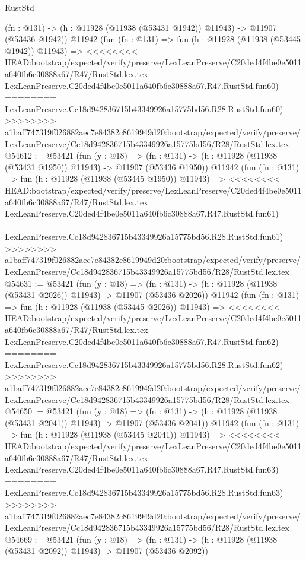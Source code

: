 \begin{lexlean}{RustStd}
\begin{coremodule}
{\begin{coremodule}
{{{{{{{{{{{{{{{{{{{{{{{{{{{{{{{{{{{{{{{{{{{{{{{{{{{{{{{{{{{{{{{{{{{{{{{{{{{{{{{{    (fn : @131) -> (h : @11928 (@11938 (@53431 @1942)) @11943) -> @11907 (@53436 @1942))
    @11942
    (fun (fn : @131) =>
    fun (h : @11928 (@11938 (@53445 @1942)) @11943) =>
<<<<<<<< HEAD:bootstrap/expected/verify/preserve/LexLeanPreserve/C20ded4f4be0e5011a640fb6c30888a67/R47/RustStd.lex.tex
    LexLeanPreserve.C20ded4f4be0e5011a640fb6c30888a67.R47.RustStd.fun60)
========
    LexLeanPreserve.Cc18d942836715b43349926a15775bd56.R28.RustStd.fun60)
>>>>>>>> a1baff747319f026882aec7e84382c8619949d20:bootstrap/expected/verify/preserve/LexLeanPreserve/Cc18d942836715b43349926a15775bd56/R28/RustStd.lex.tex
@54612 := @53421
    (fun (y : @18) =>
    (fn : @131) -> (h : @11928 (@11938 (@53431 @1950)) @11943) -> @11907 (@53436 @1950))
    @11942
    (fun (fn : @131) =>
    fun (h : @11928 (@11938 (@53445 @1950)) @11943) =>
<<<<<<<< HEAD:bootstrap/expected/verify/preserve/LexLeanPreserve/C20ded4f4be0e5011a640fb6c30888a67/R47/RustStd.lex.tex
    LexLeanPreserve.C20ded4f4be0e5011a640fb6c30888a67.R47.RustStd.fun61)
========
    LexLeanPreserve.Cc18d942836715b43349926a15775bd56.R28.RustStd.fun61)
>>>>>>>> a1baff747319f026882aec7e84382c8619949d20:bootstrap/expected/verify/preserve/LexLeanPreserve/Cc18d942836715b43349926a15775bd56/R28/RustStd.lex.tex
@54631 := @53421
    (fun (y : @18) =>
    (fn : @131) -> (h : @11928 (@11938 (@53431 @2026)) @11943) -> @11907 (@53436 @2026))
    @11942
    (fun (fn : @131) =>
    fun (h : @11928 (@11938 (@53445 @2026)) @11943) =>
<<<<<<<< HEAD:bootstrap/expected/verify/preserve/LexLeanPreserve/C20ded4f4be0e5011a640fb6c30888a67/R47/RustStd.lex.tex
    LexLeanPreserve.C20ded4f4be0e5011a640fb6c30888a67.R47.RustStd.fun62)
========
    LexLeanPreserve.Cc18d942836715b43349926a15775bd56.R28.RustStd.fun62)
>>>>>>>> a1baff747319f026882aec7e84382c8619949d20:bootstrap/expected/verify/preserve/LexLeanPreserve/Cc18d942836715b43349926a15775bd56/R28/RustStd.lex.tex
@54650 := @53421
    (fun (y : @18) =>
    (fn : @131) -> (h : @11928 (@11938 (@53431 @2041)) @11943) -> @11907 (@53436 @2041))
    @11942
    (fun (fn : @131) =>
    fun (h : @11928 (@11938 (@53445 @2041)) @11943) =>
<<<<<<<< HEAD:bootstrap/expected/verify/preserve/LexLeanPreserve/C20ded4f4be0e5011a640fb6c30888a67/R47/RustStd.lex.tex
    LexLeanPreserve.C20ded4f4be0e5011a640fb6c30888a67.R47.RustStd.fun63)
========
    LexLeanPreserve.Cc18d942836715b43349926a15775bd56.R28.RustStd.fun63)
>>>>>>>> a1baff747319f026882aec7e84382c8619949d20:bootstrap/expected/verify/preserve/LexLeanPreserve/Cc18d942836715b43349926a15775bd56/R28/RustStd.lex.tex
@54669 := @53421
    (fun (y : @18) =>
    (fn : @131) -> (h : @11928 (@11938 (@53431 @2092)) @11943) -> @11907 (@53436 @2092))
}}}}}}}}}}}}}}}}}}}}}}}}}}}}}}}}}}}}}}}}}}}}}}}}}}}}}}}}}}}}}}}}}}}}}}}}}}}}}}}}
\end{coremodule}}
\end{coremodule}
\end{lexlean}
